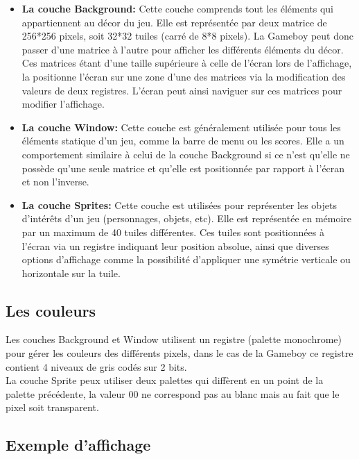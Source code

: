 \documentclass{report}
\begin{document}
\begin{itemize}
\item \textbf{La couche Background:}
	Cette couche comprends tout les éléments qui appartiennent au décor du
jeu. Elle est représentée par deux matrice de 256*256 pixels, soit 32*32
tuiles (carré de 8*8 pixels). La Gameboy peut donc passer d'une matrice à
l'autre pour afficher les différents éléments du décor. Ces matrices étant
d'une taille supérieure à celle de l'écran lors de l'affichage, la positionne
l'écran sur une zone d'une des matrices via la modification des valeurs de
deux registres. L'écran peut ainsi naviguer sur ces matrices pour modifier
l'affichage.

\item \textbf{La couche Window:}
	Cette couche est généralement utilisée pour tous les éléments statique
d'un jeu, comme la barre de menu ou les scores. Elle a un comportement
similaire à celui de la couche Background si ce n'est qu'elle ne possède qu'une seule
matrice et qu'elle est positionnée par rapport à l'écran et non l'inverse.

\item \textbf{La couche Sprites:}
	Cette couche est utilisées pour représenter les objets d'intérêts d'un
jeu (personnages, objets, etc). Elle est représentée en mémoire par un maximum
de 40 tuiles différentes. Ces tuiles sont positionnées à l'écran via un registre indiquant leur position absolue, ainsi que diverses options d'affichage comme la possibilité d'appliquer une symétrie verticale ou horizontale sur la tuile.
\end{itemize}

\subsection{Les couleurs}

Les couches Background et Window utilisent un registre (palette monochrome) pour gérer les
couleurs des différents pixels, dans le cas de la Gameboy ce registre contient
4 niveaux de gris codés sur 2 bits.\\

La couche Sprite peux utiliser deux palettes qui diffèrent en un point de la
palette précédente, la valeur 00 ne correspond pas au blanc mais au fait que
le pixel soit transparent.



\subsection{Exemple d'affichage}
\end{document}
